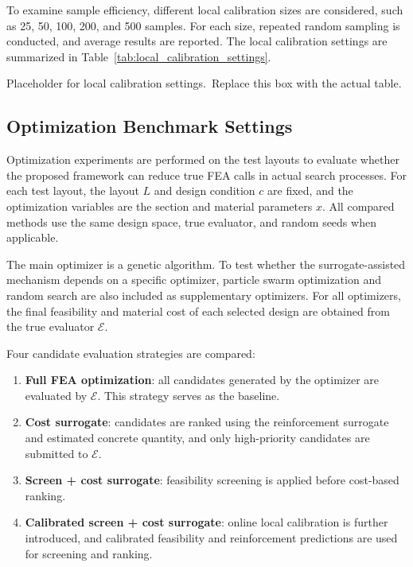 To examine sample efficiency, different local calibration sizes are considered, such as 25, 50, 100, 200, and 500 samples. For each size, repeated random sampling is conducted, and average results are reported. The local calibration settings are summarized in Table~\ref{tab:local_calibration_settings}.

\begin{table}[t]
\centering
\caption{Settings for online local calibration experiments.}
\label{tab:local_calibration_settings}
\begin{minipage}[c][0.16\textheight][c]{0.92\textwidth}
\centering
Placeholder for local calibration settings.\
Replace this box with the actual table.
\end{minipage}
\end{table}

\subsection{Optimization Benchmark Settings}
\label{subsec:optimization_benchmark_settings}

Optimization experiments are performed on the test layouts to evaluate whether the proposed framework can reduce true FEA calls in actual search processes. For each test layout, the layout $L$ and design condition $c$ are fixed, and the optimization variables are the section and material parameters $x$. All compared methods use the same design space, true evaluator, and random seeds when applicable.

The main optimizer is a genetic algorithm. To test whether the surrogate-assisted mechanism depends on a specific optimizer, particle swarm optimization and random search are also included as supplementary optimizers. For all optimizers, the final feasibility and material cost of each selected design are obtained from the true evaluator $\mathcal{E}$.

Four candidate evaluation strategies are compared:
\begin{enumerate}
\item \textbf{Full FEA optimization}: all candidates generated by the optimizer are evaluated by $\mathcal{E}$. This strategy serves as the baseline.
\item \textbf{Cost surrogate}: candidates are ranked using the reinforcement surrogate and estimated concrete quantity, and only high-priority candidates are submitted to $\mathcal{E}$.
\item \textbf{Screen + cost surrogate}: feasibility screening is applied before cost-based ranking.
\item \textbf{Calibrated screen + cost surrogate}: online local calibration is further introduced, and calibrated feasibility and reinforcement predictions are used for screening and ranking.
\end{enumerate}

